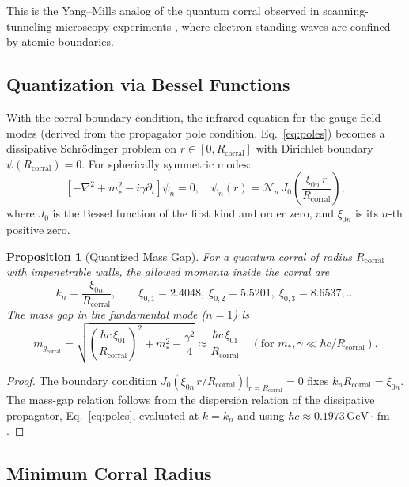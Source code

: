 \documentclass[aps,prd,reprint,superscriptaddress,floatfix]{revtex4-2}
\newtheorem{proposition}[theorem]{Proposition}
\theoremstyle{definition}
\newcommand{\GeV}{\,\mathrm{GeV}}
\newcommand{\fm}{\,\mathrm{fm}}
\newcommand{\corr}{_{\mathrm{corral}}}
\begin{document}
This is the Yang--Mills analog of the quantum corral observed in
scanning-tunneling microscopy experiments \cite{Crommie1993}, where
electron standing waves are confined by atomic boundaries.

\subsection{Quantization via Bessel Functions}

With the corral boundary condition, the infrared equation for the gauge-field
modes (derived from the propagator pole condition, Eq.~\eqref{eq:poles})
becomes a dissipative Schr\"odinger problem on $r\in[0,R\corr]$ with
Dirichlet boundary $\psi(R\corr)=0$. For spherically symmetric modes:
\begin{equation}
  \left[-\nabla^2 + m_*^2 - i\gamma\partial_t\right]\psi_n = 0,
  \quad \psi_n(r) = \mathcal{N}_n\,J_0\!\left(\frac{\xi_{0n}\,r}{R\corr}\right),
  \label{eq:bessel_eq}
\end{equation}
where $J_0$ is the Bessel function of the first kind and order zero, and
$\xi_{0n}$ is its $n$-th positive zero.

\begin{proposition}[Quantized Mass Gap]
\label{prop:quantized_gap}
For a quantum corral of radius $R\corr$ with impenetrable walls, the
allowed momenta inside the corral are
\begin{equation}
  k_n = \frac{\xi_{0n}}{R\corr},
  \qquad \xi_{0,1}=2.4048,\;\xi_{0,2}=5.5201,\;\xi_{0,3}=8.6537,\ldots
\end{equation}
The mass gap in the fundamental mode ($n=1$) is
\begin{equation}
  \boxed{m_g\corr = \sqrt{\left(\frac{\hbar c\,\xi_{01}}{R\corr}\right)^{\!2}
  + m_*^2 - \frac{\gamma^2}{4}}
  \approx \frac{\hbar c\,\xi_{01}}{R\corr}
  \quad (\text{for }m_*,\gamma\ll \hbar c/R\corr).}
  \label{eq:corral_gap}
\end{equation}
\end{proposition}

\begin{proof}
The boundary condition $J_0(\xi_{0n}\,r/R\corr)\big|_{r=R\corr}=0$ fixes
$k_n R\corr=\xi_{0n}$. The mass-gap relation follows from the dispersion
relation of the dissipative propagator, Eq.~\eqref{eq:poles}, evaluated at
$k=k_n$ and using $\hbar c\approx 0.1973\GeV\cdot\fm$.
\end{proof}

\subsection{Minimum Corral Radius}
\label{subsec:radius}
\end{document}
